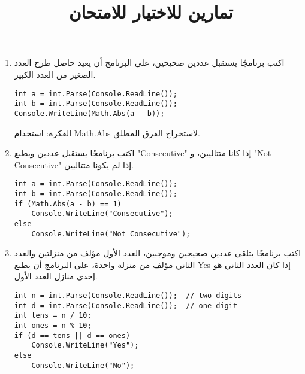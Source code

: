 \documentclass[12pt]{article}
\title{تمارين للاختيار للامتحان}
\begin{document}
\maketitle
\thispagestyle{fancy}

\begin{enumerate}[itemsep=2em]
\item
اكتب برنامجًا يستقبل عددين صحيحين، على البرنامج أن يعيد حاصل طرح العدد الصغير من العدد الكبير.

\ifwithsols
\begin{boxSolution}
\begin{english}
\begin{verbatim}
int a = int.Parse(Console.ReadLine());
int b = int.Parse(Console.ReadLine());
Console.WriteLine(Math.Abs(a - b));
\end{verbatim}
\end{english}
الفكرة: استخدام \textenglish{Math.Abs} لاستخراج الفرق المطلق.
\end{boxSolution}
\fi


\item
اكتب برنامجًا يستقبل عددين ويطبع \textenglish{"Consecutive"} إذا كانا متتاليين، و \textenglish{"Not Consecutive"} إذا لم يكونا متتاليين.

\ifwithsols
\begin{boxSolution}
\begin{english}
\begin{verbatim}
int a = int.Parse(Console.ReadLine());
int b = int.Parse(Console.ReadLine());
if (Math.Abs(a - b) == 1)
    Console.WriteLine("Consecutive");
else
    Console.WriteLine("Not Consecutive");
\end{verbatim}
\end{english}
\end{boxSolution}
\fi


\item
اكتب برنامجًا يتلقى عددين صحيحين وموجبين، العدد الأول مؤلف من منزلتين والعدد الثاني مؤلف من منزلة واحدة، على البرنامج أن يطبع \textenglish{Yes} إذا كان العدد الثاني هو إحدى منازل العدد الأول.

\ifwithsols
\begin{boxSolution}
\begin{english}
\begin{verbatim}
int n = int.Parse(Console.ReadLine());  // two digits
int d = int.Parse(Console.ReadLine());  // one digit
int tens = n / 10;
int ones = n % 10;
if (d == tens || d == ones)
    Console.WriteLine("Yes");
else
    Console.WriteLine("No");
\end{verbatim}
\end{english}
\end{boxSolution}
\fi



\end{enumerate}
\end{document}
